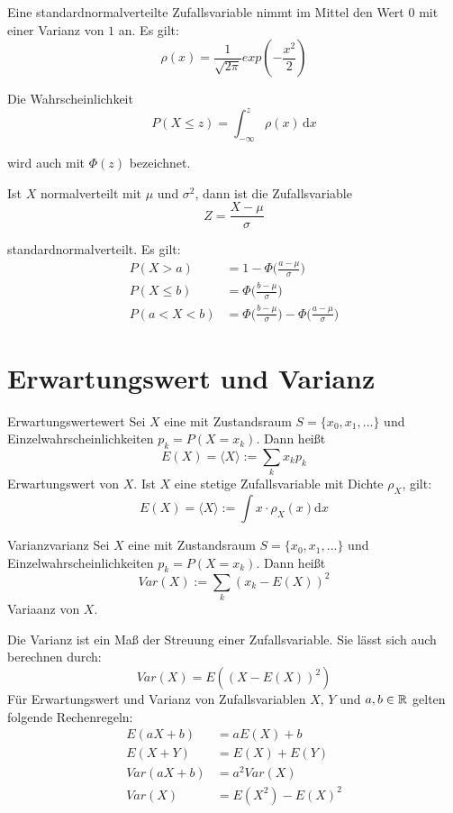 Eine standardnormalverteilte Zufallsvariable nimmt im Mittel den Wert $0$ mit
einer Varianz von $1$ an. Es gilt:
\[\rho(x) = \frac{1}{\sqrt{2\pi}}exp(-\frac{x^2}{2})\]

Die Wahrscheinlichkeit
\[P(X \le z) = \int_{-\infty}^{z}\rho(x)\,\mathrm{d}x\]

wird auch mit $\Phi(z)$ bezeichnet.

Ist $X$ normalverteilt mit $\mu$ und $\sigma^2$, dann ist die Zufallsvariable
\[Z=\frac{X-\mu}{\sigma}\]

standardnormalverteilt. Es gilt:
\begin{align*}
P(X>a) &= 1 - \Phi\Big(\frac{a-\mu}{\sigma}\Big) \\
P(X\le b) &= \Phi\Big(\frac{b-\mu}{\sigma}\Big) \\
P(a < X < b) &= \Phi\Big(\frac{b-\mu}{\sigma}\Big) - \Phi\Big(\frac{a-\mu}{\sigma}\Big)
\end{align*}

\section{Erwartungswert und Varianz}

\begin{definition}{Erwartungswert}{ewert}
Sei $X$ eine  mit Zustandsraum $S=\{x_0, x_1,
...\}$ und Einzelwahrscheinlichkeiten $p_k=P(X=x_k)$. Dann heißt
\[E(X) =\langle X\rangle := \sum_k x_kp_k\]
Erwartungswert von $X$. Ist $X$ eine stetige Zufallsvariable mit Dichte
$\rho_X$, gilt:
\[E(X) =\langle X\rangle := \int x\cdot\rho_X(x)\mathrm{d}x\]
\end{definition}

\begin{definition}{Varianz}{varianz}
Sei $X$ eine  mit Zustandsraum $S=\{x_0, x_1,
...\}$ und Einzelwahrscheinlichkeiten $p_k=P(X=x_k)$. Dann heißt
\[Var(X) := \sum_k (x_k - E(X))^2\]
Variaanz von $X$.
\end{definition}

Die Varianz ist ein Maß der Streuung einer Zufallsvariable. Sie lässt sich auch
berechnen durch:
\[Var(X) = E((X-E(X))^2)\]
Für Erwartungswert und Varianz von Zufallsvariablen $X$, $Y$ und $a,b\in\mathbb{R}$ gelten
folgende Rechenregeln:
\begin{align*}
E(aX+b) &= aE(X) + b \\
E(X+Y) &= E(X) + E(Y) \\
Var(aX+b) &= a^2 Var(X) \\
Var(X) &= E(X^2) - E(X)^2
\end{align*}

